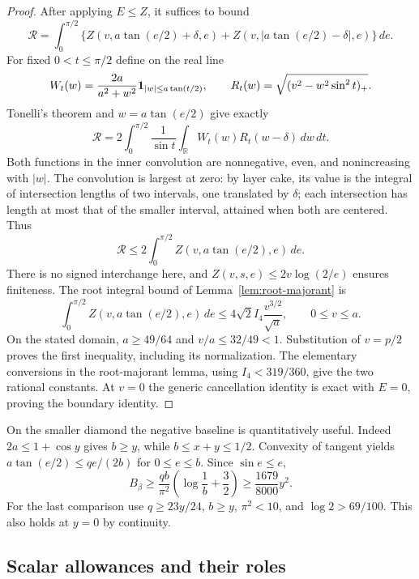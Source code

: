 \begin{proof}
After applying $E\leq Z$, it suffices to bound
\[
 \mathcal R=\int_0^{\pi/2}
       \{Z(v,a\tan(e/2)+\delta,e)+Z(v,|a\tan(e/2)-\delta|,e)\}\,de.
\]
For fixed $0<t\leq\pi/2$ define on the real line
\[
 W_t(w)=\frac{2a}{a^2+w^2}{\bf1}_{|w|\leq a\tan(t/2)},
 \qquad R_t(w)=\sqrt{(v^2-w^2\sin^2t)_+}.
\]
Tonelli's theorem and $w=a\tan(e/2)$ give exactly
\[
 \mathcal R=2\int_0^{\pi/2}\frac1{\sin t}
              \int_{\mathbb R}W_t(w)R_t(w-\delta)\,dw\,dt.
\]
Both functions in the inner convolution are nonnegative, even, and
nonincreasing with $|w|$.  The convolution is largest at zero: by
layer cake, its value is the integral of intersection lengths of two
intervals, one translated by $\delta$; each intersection has length at
most that of the smaller interval, attained when both are centered.
Thus
\[
 \mathcal R\leq2\int_0^{\pi/2}Z(v,a\tan(e/2),e)\,de.
\]
There is no signed interchange here, and
$Z(v,s,e)\leq2v\log(2/e)$ ensures finiteness.  The root integral bound
of Lemma~\ref{lem:root-majorant} is
\[
 \int_0^{\pi/2}Z(v,a\tan(e/2),e)\,de
       \leq4\sqrt2 I_4\frac{v^{3/2}}{\sqrt a},\qquad 0\leq v\leq a.
\]
On the stated domain, $a\geq49/64$ and $v/a\leq32/49<1$.
Substitution of $v=p/2$ proves the first inequality, including its
normalization.  The elementary conversions in the root-majorant lemma,
using $I_4<319/360$, give the two rational constants.  At $v=0$ the
generic cancellation identity is exact with $E=0$, proving the boundary
identity.
\end{proof}

On the smaller diamond the negative baseline is quantitatively useful.
Indeed $2a\leq1+\cos y$ gives $b\geq y$, while $b\leq x+y\leq1/2$.
Convexity of tangent yields
$a\tan(e/2)\leq qe/(2b)$ for $0\leq e\leq b$.  Since $\sin e\leq e$,
\begin{equation}
 B_\beta\geq\frac{qb}{\pi^2}\left(\log\frac1b+\frac32\right)
       \geq\frac{1679}{8000}y^2.                   \label{eq:argmax-beta-quadratic}
\end{equation}
For the last comparison use $q\geq23y/24$, $b\geq y$, $\pi^2<10$,
and $\log2>69/100$.  This also holds at $y=0$ by continuity.

\subsection{Scalar allowances and their roles}

